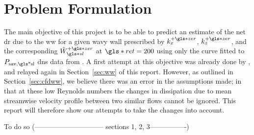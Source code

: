 \section{Problem Formulation}\label{sec:objective} 
The main objective of this project is to be able to predict an estimate of the net \gls{dr} due to the \gls{ww} for a given wavy wall prescribed by $k_x\pz$, $k_z\pz$, and the corresponding $\hat{W}\pz\ssl$ at $ \gls*{ret}=200$ using only the curve fitted to $P_\text{sav,\gls*{sl}} $ \gls{dns} data from \vqt. A first attempt at this objective was already done by \sct, and relayed again in Section~\ref{sec:ww} of this report. However, as outlined in Section~\ref{sec:cfdww}, we believe there was an error in the assumptions made; in that at these low Reynolds numbers the changes in dissipation due to mean streamwise velocity profile between two similar flows cannot be ignored. This report will therefore show our attempts to take the changes into account.

To do so (------------------------------ sections 1, 2, 3----------------)





